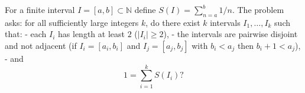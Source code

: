 For a finite interval $I=[a,b]\subset\mathbb{N}$ define $S(I)=\sum_{n=a}^{b}1/n$.
The problem asks: for all sufficiently large integers $k$, do there exist $k$ intervals $I_1,\dots,I_k$ such that:
- each $I_i$ has length at least $2$ ($|I_i|\ge 2$),
- the intervals are pairwise disjoint and not adjacent (if $I_i=[a_i,b_i]$ and $I_j=[a_j,b_j]$ with $b_i<a_j$ then $b_i+1<a_j$),
- and
\[1=\sum_{i=1}^k S(I_i)?\]
